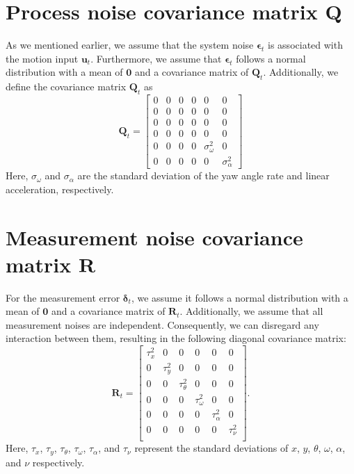 \documentclass[12pt, a4paper]{article}
\begin{document}
\section{Process noise covariance matrix $\bm{Q}$}
As we mentioned earlier, we assume that the system noise $\bm{\epsilon}_{t}$ is associated with the motion input $\bm{u}_{t}$. Furthermore, we assume that $\bm{\epsilon}_{t}$ follows a normal distribution with a mean of $\bm{0}$ and a covariance matrix of $\bm{Q}_{t}$. Additionally, we define the covariance matrix $\bm{Q}_{t}$ as
\[
  \bm{Q}_{t}=\begin{bmatrix}
    0 & 0 & 0 & 0 & 0 & 0\\
    0 & 0 & 0 & 0 & 0 & 0\\
    0 & 0 & 0 & 0 & 0 & 0\\
    0 & 0 & 0 & 0 & 0 & 0\\
    0 & 0 & 0 & 0 &\sigma_{\omega}^{2} & 0\\
    0 & 0 & 0 & 0 &0 & \sigma_{\alpha}^{2}
  \end{bmatrix}
\]
Here, $\sigma_{\omega}$ and $\sigma_{\alpha}$ are the standard deviation of the yaw angle rate and linear acceleration, respectively. %

\section{Measurement noise covariance matrix $\bm{R}$}
For the measurement error $\bm{\delta}_{t}$, we assume it follows a normal distribution with a mean of $\bm{0}$ and a covariance matrix of $\bm{R}_{t}$. Additionally, we assume that all measurement noises are independent. Consequently, we can disregard any interaction between them, resulting in the following diagonal covariance matrix:
\[
  \bm{R}_{t} = \begin{bmatrix}
    \tau_{x}^2 & 0 & 0 & 0 & 0 & 0\\
    0 & \tau_{y}^2 & 0 & 0 & 0 & 0\\
    0 & 0 &\tau_{\theta}^2 & 0 & 0 & 0\\
    0 & 0 & 0 & \tau_{\omega}^2 & 0 & 0\\
    0 & 0 & 0 & 0 & \tau_{\alpha}^2 & 0\\
    0 & 0 & 0 & 0 & 0 & \tau_{\nu}^2\\
  \end{bmatrix}.
\]
Here, $\tau_{x}$, $\tau_{y}$, $\tau_{\theta}$, $\tau_{\omega}$, $\tau_{\alpha}$, and $\tau_{\nu}$ represent the standard deviations of $x$, $y$, $\theta$, $\omega$, $\alpha$, and $\nu$ respectively.
\end{document}
